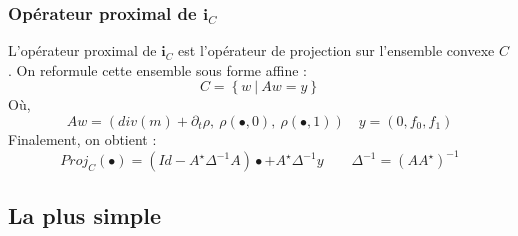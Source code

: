 \documentclass{beamer}
\begin{document}
\begin{frame}
\frametitle{Opérateur proximal de $\mathbf{i}_C$}
L'opérateur proximal de $\mathbf{i}_C$ est l'opérateur de projection sur l'ensemble convexe $C$. On reformule cette ensemble sous forme affine : 
$$
C = \left\{w\ |\ Aw = y \right\}
$$
Où, 
$$
Aw = (div(m) +\partial_t \rho,\ \rho (\bullet,0),\ \rho (\bullet ,1)) \quad y = (0,f_0,f_1)
$$
Finalement, on obtient : 
$$
Proj_C(\bullet) = (Id-A^{\star}\Delta^{-1}A)\bullet + A^{\star}\Delta^{-1}y \qquad \Delta^{-1} = (AA^{\star})^{-1}
$$
\end{frame}


\subsection{La plus simple}

\end{document}
